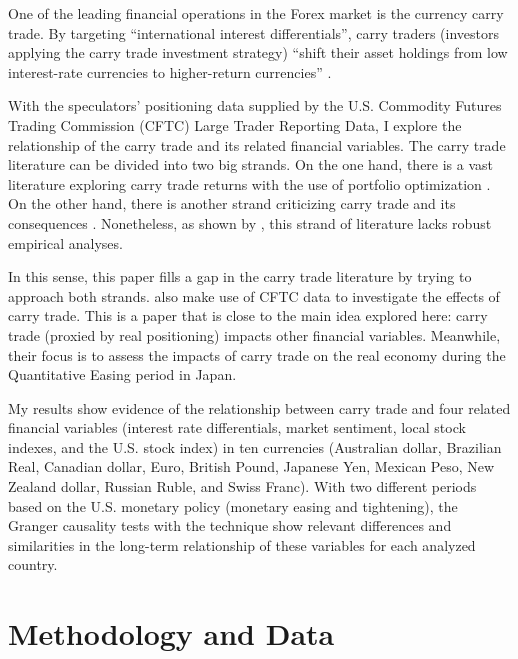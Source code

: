 \documentclass[a4paper, twoside]{templates/ociamthesis}
\begin{document}
One of the leading financial operations in the Forex market is the currency carry trade. By targeting ``international interest differentials'', carry traders (investors applying the carry trade investment strategy) ``shift their asset holdings from low interest-rate currencies to higher-return currencies'' \autocite[ 3]{grenville2010}.

With the speculators' positioning data supplied by the U.S. Commodity Futures Trading Commission (CFTC) Large Trader Reporting Data, I explore the relationship of the carry trade and its related financial variables. The carry trade literature can be divided into two big strands. On the one hand, there is a vast literature exploring carry trade returns with the use of portfolio optimization \autocites[e.g.,][]{clarida2009,cenedese2014,doskov2015,kang2020}. On the other hand, there is another strand criticizing carry trade and its consequences \autocites[e.g.,][]{miranda-agrippino2013,goda2019}. Nonetheless, as shown by \textcite{disyatat2013}, this strand of literature lacks robust empirical analyses.

In this sense, this paper fills a gap in the carry trade literature by trying to approach both strands. \textcite{chuffart2020} also make use of CFTC data to investigate the effects of carry trade. This is a paper that is close to the main idea explored here: carry trade (proxied by real positioning) impacts other financial variables. Meanwhile, their focus is to assess the impacts of carry trade on the real economy during the Quantitative Easing period in Japan.

My results show evidence of the relationship between carry trade and four related financial variables (interest rate differentials, market sentiment, local stock indexes, and the U.S. stock index) in ten currencies (Australian dollar, Brazilian Real, Canadian dollar, Euro, British Pound, Japanese Yen, Mexican Peso, New Zealand dollar, Russian Ruble, and Swiss Franc). With two different periods based on the U.S. monetary policy (monetary easing and tightening), the Granger causality tests with the \textcite{toda1995} technique show relevant differences and similarities in the long-term relationship of these variables for each analyzed country.

\hypertarget{threetwo}{%
\section{Methodology and Data}\label{threetwo}}
\end{document}
